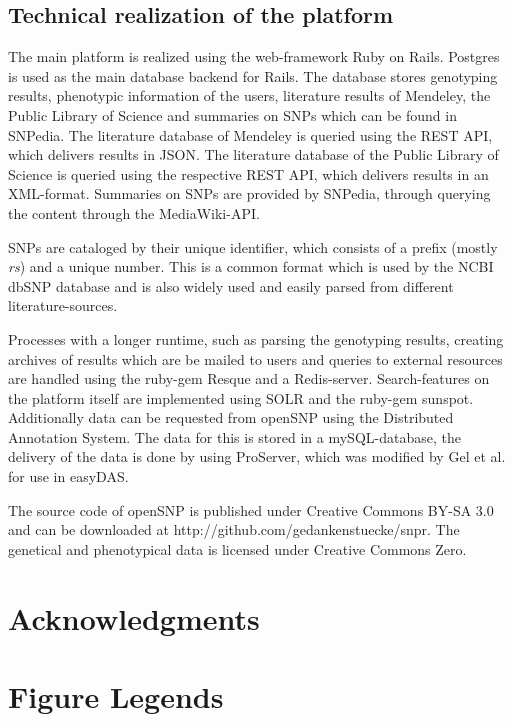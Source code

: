 \documentclass[10pt]{article}
\begin{document}
\subsection*{Technical realization of the platform}
The main platform is realized using the web-framework Ruby on Rails. Postgres is used as the main database backend for Rails. The database stores genotyping results, phenotypic information of the users, literature results of Mendeley, the Public Library of Science and summaries on SNPs which can be found in SNPedia. The literature database of Mendeley is queried using the REST API, which delivers results in JSON. The literature database of the Public Library of Science is queried using the respective REST API, which delivers results in an XML-format. Summaries on SNPs are provided by SNPedia, through querying the content through the MediaWiki-API. 

SNPs are cataloged by their unique identifier, which consists of a prefix (mostly \textit{rs}) and a unique number. This is a common format which is used by the NCBI dbSNP database and is also widely used and easily parsed from different literature-sources.   

Processes with a longer runtime, such as parsing the genotyping results, creating archives of results which are be mailed to users and queries to external resources are handled using the ruby-gem Resque and a Redis-server. Search-features on the platform itself are implemented using SOLR and the ruby-gem sunspot. Additionally data can be requested from openSNP using the Distributed Annotation System. The data for this is stored in a mySQL-database, the delivery of the data is done by using ProServer, which was modified by Gel et al. for use in easyDAS.  

The source code of openSNP is published under Creative Commons BY-SA 3.0 and can be downloaded at http://github.com/gedankenstuecke/snpr. The genetical and phenotypical data is licensed under Creative Commons Zero. 
\section*{Acknowledgments}




\section*{Figure Legends}
\end{document}
